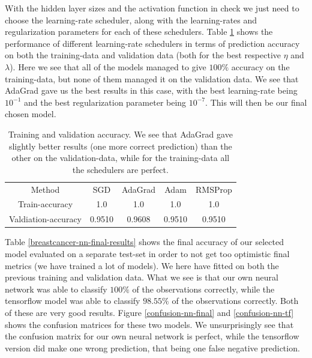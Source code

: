 \documentclass{article}
\begin{document}
With the hidden layer sizes and the activation function in check we just need to
choose the learning-rate scheduler, along with the learning-rates and
regularization parameters for each of these schedulers. Table
\ref{breastcancer-nn-lr-schedulers} shows the performance of different
learning-rate schedulers in terms of prediction accuracy on both the
training-data and validation data (both for the best respective $\eta$ and
$\lambda$). Here we see that all of the models managed to give $100\%$ accuracy
on the training-data, but none of them managed it on the validation data. We see
that AdaGrad gave us the best results in this case, with the best learning-rate
being $10^{-1}$ and the best regularization parameter being $10^{-7}$. This will
then be our final chosen model.

\begin{table}
      \centering
      \begin{tabular}{| c | c | c | c | c |}
            Method              & SGD    & AdaGrad & Adam   & RMSProp \\
            Train-accuracy      & 1.0    & 1.0     & 1.0    & 1.0     \\
            Valdiation-accuracy & 0.9510 & 0.9608  & 0.9510 & 0.9510  \\
      \end{tabular}
      \caption{Training and validation accuracy. We see that AdaGrad gave
            slightly better results (one more correct prediction) than the other on
            the validation-data, while for the training-data all the schedulers are
            perfect.}
      \label{breastcancer-nn-lr-schedulers}
\end{table}

Table \ref{breastcancer-nn-final-results} shows the final accuracy of our
selected model evaluated on a separate test-set in order to not get too
optimistic final metrics (we have trained a lot of models). We here have fitted
on both the previous training and validation data. What we see is that our own
neural network was able to classify $100\%$ of the observations correctly, while
the tensorflow model was able to classify $98.55\%$ of the observations
correctly. Both of these are very good results. Figure \ref{confusion-nn-final}
and \ref{confusion-nn-tf} shows the confusion matrices for these two
models. We unsurprisingly see that the confusion matrix for our own neural
network is perfect, while the tensorflow version did make one wrong prediction,
that being one false negative prediction.
\end{document}

